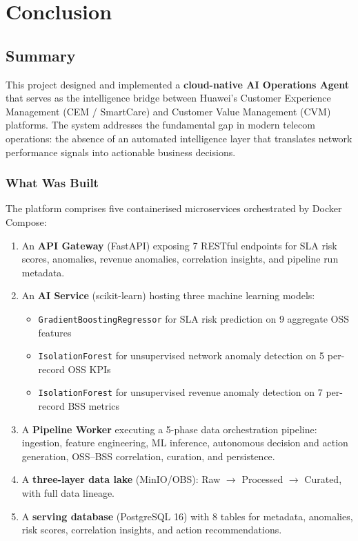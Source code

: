 \chapter{Conclusion}
\label{ch:conclusion}

\section{Summary}

This project designed and implemented a \textbf{cloud-native AI Operations Agent} that serves as the intelligence bridge between Huawei's Customer Experience Management (CEM / SmartCare) and Customer Value Management (CVM) platforms. The system addresses the fundamental gap in modern telecom operations: the absence of an automated intelligence layer that translates network performance signals into actionable business decisions.

\subsection{What Was Built}

The platform comprises five containerised microservices orchestrated by Docker Compose:

\begin{enumerate}
  \item An \textbf{API Gateway} (FastAPI) exposing 7 RESTful endpoints for SLA risk scores, anomalies, revenue anomalies, correlation insights, and pipeline run metadata.
  
  \item An \textbf{AI Service} (scikit-learn) hosting three machine learning models:
  \begin{itemize}
    \item \texttt{GradientBoostingRegressor} for SLA risk prediction on 9 aggregate OSS features
    \item \texttt{IsolationForest} for unsupervised network anomaly detection on 5 per-record OSS KPIs
    \item \texttt{IsolationForest} for unsupervised revenue anomaly detection on 7 per-record BSS metrics
  \end{itemize}
  
  \item A \textbf{Pipeline Worker} executing a 5-phase data orchestration pipeline: ingestion, feature engineering, ML inference, autonomous decision and action generation, OSS--BSS correlation, curation, and persistence.
  
  \item A \textbf{three-layer data lake} (MinIO/OBS): Raw $\to$ Processed $\to$ Curated, with full data lineage.
  
  \item A \textbf{serving database} (PostgreSQL 16) with 8 tables for metadata, anomalies, risk scores, correlation insights, and action recommendations.
\end{enumerate}


